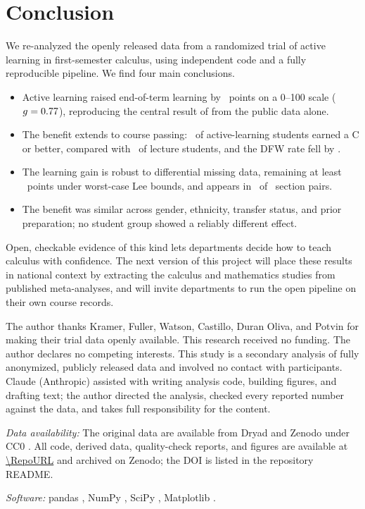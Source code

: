 \documentclass[10pt,twocolumn,letterpaper]{article}
\begin{document}
\section{Conclusion}\label{sec:conclusion}

We re-analyzed the openly released data from a randomized trial of active learning in first-semester calculus, using independent code and a fully reproducible pipeline. We find four main conclusions.

\begin{itemize}
\item Active learning raised end-of-term learning by \LMest\ points on a 0--100 scale ($g = 0.77$), reproducing the central result of \citet{kramer2023} from the public data alone.
\item The benefit extends to course passing: \PassAct\ of active-learning students earned a C or better, compared with \PassLec\ of lecture students, and the DFW rate fell by \DFWRed.
\item The learning gain is robust to differential missing data, remaining at least \LeeLo\ points under worst-case Lee bounds, and appears in \PairsFav\ of \PairsN\ section pairs.
\item The benefit was similar across gender, ethnicity, transfer status, and prior preparation; no student group showed a reliably different effect.
\end{itemize}

Open, checkable evidence of this kind lets departments decide how to teach calculus with confidence. The next version of this project will place these results in national context by extracting the calculus and mathematics studies from published meta-analyses, and will invite departments to run the open pipeline on their own course records.

\vspace{6pt}
{\footnotesize
\noindent The author thanks Kramer, Fuller, Watson, Castillo, Duran Oliva, and Potvin for making their trial data openly available. This research received no funding. The author declares no competing interests. This study is a secondary analysis of fully anonymized, publicly released data and involved no contact with participants. Claude (Anthropic) assisted with writing analysis code, building figures, and drafting text; the author directed the analysis, checked every reported number against the data, and takes full responsibility for the content.

\vspace{4pt}
\noindent\textit{Data availability:} The original data are available from Dryad and Zenodo under CC0 \citep{kramer2023data}. All code, derived data, quality-check reports, and figures are available at \url{\RepoURL} and archived on Zenodo; the DOI is listed in the repository README.

\vspace{4pt}
\noindent\textit{Software:} pandas \citep{mckinney2010}, NumPy \citep{harris2020}, SciPy \citep{virtanen2020}, Matplotlib \citep{hunter2007}.\par}
\end{document}
